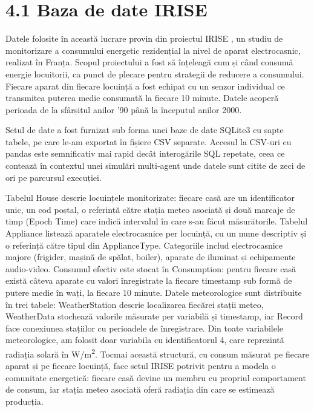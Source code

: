 \documentclass[12pt,a4paper]{report}
\begin{document}
\section*{4.1 Baza de date IRISE}

Datele folosite în această lucrare provin din proiectul IRISE \cite{irise2025}, un studiu de monitorizare a consumului energetic rezidențial la nivel de aparat electrocasnic, realizat în Franța. Scopul proiectului a fost să înțeleagă cum și când consumă energie locuitorii, ca punct de plecare pentru strategii de reducere a consumului. Fiecare aparat din fiecare locuință a fost echipat cu un senzor individual ce transmitea puterea medie consumată la fiecare 10 minute. Datele acoperă perioada de la sfârșitul anilor '90 până la începutul anilor 2000.

Setul de date a fost furnizat sub forma unei baze de date SQLite3 cu șapte tabele, pe care le-am exportat în fișiere CSV separate. Accesul la CSV-uri cu pandas este semnificativ mai rapid decât interogările SQL repetate, ceea ce contează în contextul unei simulări multi-agent unde datele sunt citite de zeci de ori pe parcursul execuției.

Tabelul House descrie locuințele monitorizate: fiecare casă are un identificator unic, un cod poștal, o referință către stația meteo asociată și două marcaje de timp (Epoch Time) care indică intervalul în care s-au făcut măsurătorile. Tabelul Appliance listează aparatele electrocasnice per locuință, cu un nume descriptiv și o referință către tipul din ApplianceType. Categoriile includ electrocasnice majore (frigider, mașină de spălat, boiler), aparate de iluminat și echipamente audio-video. Consumul efectiv este stocat în Consumption: pentru fiecare casă există câteva aparate cu valori înregistrate la fiecare timestamp sub formă de putere medie în wați, la fiecare 10 minute. Datele meteorologice sunt distribuite în trei tabele: WeatherStation descrie localizarea fiecărei stații meteo, WeatherData stochează valorile măsurate per variabilă și timestamp, iar Record face conexiunea stațiilor cu perioadele de înregistrare. Din toate variabilele meteorologice, am folosit doar variabila cu identificatorul 4, care reprezintă radiația solară în W/m\textsuperscript{2}. Tocmai această structură, cu consum măsurat pe fiecare aparat și pe fiecare locuință, face setul IRISE potrivit pentru a modela o comunitate energetică: fiecare casă devine un membru cu propriul comportament de consum, iar stația meteo asociată oferă radiația din care se estimează producția.
\end{document}
